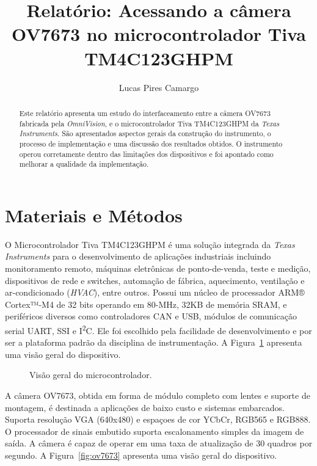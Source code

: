 \documentclass[hidelinks, a4paper, 9pt, twocolumn]{article}
\title{Relatório: Acessando a câmera OV7673 no microcontrolador Tiva TM4C123GHPM}
\author{Lucas Pires Camargo}
\newcommand{\fig}[4][ht!]{
  \begin{figure}[#1]
    {\centering{\texttt{[image: \#2]}}\par}
    \caption{#3}
    \label{fig:#2}
  \end{figure}
}
\begin{document}
\maketitle

\begin{abstract}
Este relatório apresenta um estudo do interfaceamento entre a câmera OV7673 fabricada pela \textit{OmniVision}\cite{ov7673}, e o microcontrolador Tiva TM4C123GHPM da \textit{Texas Instruments}\cite{tiva}. 
São apresentados aspectos gerais da construção do instrumento, o processo de implementação e uma discussão dos resultados obtidos. O instrumento operou corretamente dentro das limitações dos dispositivos e
foi apontado como melhorar a qualidade da implementação.
\end{abstract}


\section{Materiais e Métodos}

O Microcontrolador Tiva TM4C123GHPM é uma solução integrada da \textit{Texas Instruments} para o desenvolvimento de aplicações industriais incluindo monitoramento remoto, máquinas eletrônicas de ponto-de-venda, teste e medição, dispositivos de rede e switches, automação de fábrica, aquecimento, ventilação e ar-condicionado (\textit{HVAC}), entre outros. Possui um núcleo de processador ARM® Cortex™-M4 de 32 bits operando em 80-MHz, 32KB de memória SRAM, e periféricos diversos como controladores CAN e USB, módulos de comunicação serial UART, SSI e I\textsuperscript{2}C. Ele foi escolhido pela facilidade de desenvolvimento e por ser a plataforma padrão da disciplina de instrumentação. A Figura~\ref{fig:tiva} apresenta uma visão geral do dispositivo.


\fig{tiva}{Visão geral do microcontrolador.}{width=\columnwidth}

A câmera OV7673, obtida em forma de módulo completo com lentes e suporte de montagem, é destinada a aplicações de baixo custo e sistemas embarcados. Suporta resolução VGA (640x480) e espaçoes de cor YCbCr, RGB565 e RGB888. O processador de sinais embutido suporta escalonamento simples da imagem de saída. A câmera é capaz de operar em uma taxa de atualização de 30 quadros por segundo. A Figura~\ref{fig:ov7673} apresenta uma visão geral do dispositivo. 
\end{document}
